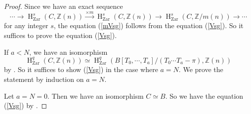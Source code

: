 \documentclass{article}
\newcommand{\Zar}{\mathrm{Zar}}
\newcommand{\HO}{\operatorname{H}}
\begin{document}
%
\begin{proof}\upshape
Since we have an exact sequence
%
\begin{equation*}
\cdots 
\to
\HO^{s}_{\Zar}(C, \mathbb{Z}(n))
\xrightarrow{\times m}
\HO^{s}_{\Zar}(C, \mathbb{Z}(n))
\to
\HO^{s}_{\Zar}(C, \mathbb{Z}/m(n))
\to \cdots
\end{equation*}
%
for any integer $s$, the equation (\ref{mVsg}) follows from the equation (\ref{Vsg}).
So it suffices to prove the equation (\ref{Vsg}).

If $a<N$, we have an isomorphism
%
\begin{equation*}
\HO^{q}_{\Zar}(
C,
\mathbb{Z}(n)
)    
\simeq
\HO^{q}_{\Zar}(
B[T_{0}, \cdots, T_{a}]/(
T_{0}\cdots T_{a}-\pi
),
\mathbb{Z}(n)
)
\end{equation*}
%
by \cite[p.781, Corollary 3.5]{Ge}.
So it suffices to show (\ref{Vsg}) in the case where $a=N$.
We prove the statement by induction on $a=N$.

Let $a=N=0$. Then we have an isomorphism
$C\simeq B$. So we have the equation (\ref{Vsg}) 
by 
\cite[p.786, Corollary 4.4]{Ge}.


\end{proof}
\end{document}
